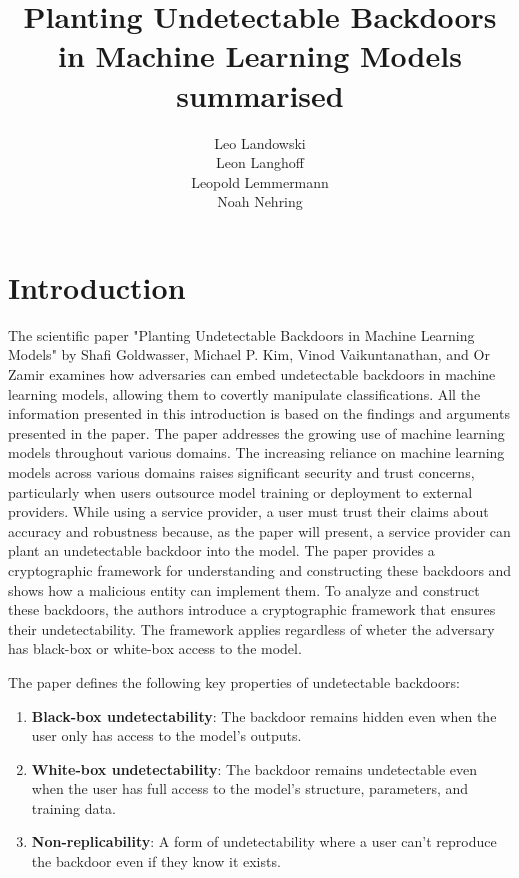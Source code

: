 \documentclass[
	fontsize=12pt,
	headings=small,
	parskip=quarter,
	bibliography=totoc,
	numbers=noenddot,       
	open=any,               
 	final                   
]{scrreprt}
\title{Planting Undetectable Backdoors in Machine Learning Models summarised}
\author{Leo Landowski \\ Leon Langhoff \\ Leopold Lemmermann \\ Noah Nehring }
\begin{document}

\tableofcontents
\thispagestyle{empty}
\setcounter{page}{0}


\chapter{Introduction}
The scientific paper "Planting Undetectable Backdoors in Machine Learning Models" by Shafi Goldwasser, Michael P. Kim, Vinod Vaikuntanathan, and Or Zamir \cite{goldwasser2022backdoors} examines how adversaries can embed undetectable backdoors in machine learning models, allowing them to covertly manipulate classifications. All the information presented in this introduction is based on the findings and arguments presented in the paper. The paper addresses the growing use of machine learning models throughout various domains. The increasing reliance on machine learning models across various domains raises significant security and trust concerns, particularly when users outsource model training or deployment to external providers. While using a service provider, a user must trust their claims about accuracy and robustness because, as the paper will present, a service provider can plant an undetectable backdoor into the model. The paper provides a cryptographic framework for understanding and constructing these backdoors and shows how a malicious entity can implement them. To analyze and construct these backdoors, the authors introduce a cryptographic framework that ensures their undetectability. The framework applies regardless of wheter the adversary has black-box or white-box access to the model. 
\par The paper defines the following key properties of undetectable backdoors:
\begin{enumerate} \itemsep -5pt
	\item \textbf{Black-box undetectability}: The backdoor remains hidden even when the user only has access to the model’s outputs.
	\item \textbf{White-box undetectability}: The backdoor remains undetectable even when the user has full access to the model’s structure, parameters, and training data.
	\item \textbf{Non-replicability}: A form of undetectability where a user can't reproduce the backdoor even if they know it exists. 
\end{enumerate}
\end{document}
